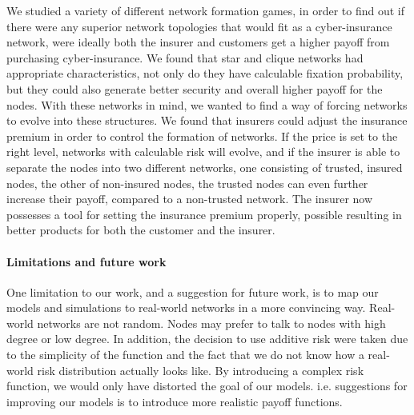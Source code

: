 We studied a variety of different network formation games, in order to find out if there were any superior network topologies that would fit as a cyber-insurance network, were ideally both the insurer and customers get a higher payoff from purchasing cyber-insurance. 
We found that star and clique networks had appropriate characteristics, not only do they have calculable fixation probability, but they could also generate better security and overall higher payoff for the nodes. With these networks in mind, we wanted to find a way of forcing networks to evolve into these structures.  We found that insurers could adjust the insurance premium in order to control the formation of networks. If the price is set to the right level, networks with calculable risk will evolve, and if the insurer is able to separate the nodes into two different networks, one consisting of trusted, insured nodes, the other of non-insured nodes, the trusted nodes can even further increase their payoff, compared to a non-trusted network. The insurer now possesses a tool for setting the insurance premium properly, possible resulting in better products for both the customer and the insurer.

\paragraph{Limitations and future work}
One limitation to our work, and a suggestion for future work, is to map our models and simulations to real-world networks in a more convincing way. Real-world networks are not random. Nodes may prefer to talk to nodes with high degree or low degree. In addition, the decision to use additive risk were taken due to the simplicity of the function and the fact that we do not know how a real-world risk distribution actually looks like.  By introducing a complex risk function, we would only have distorted the goal of our models. i.e. suggestions for improving our models is to introduce more realistic payoff functions.